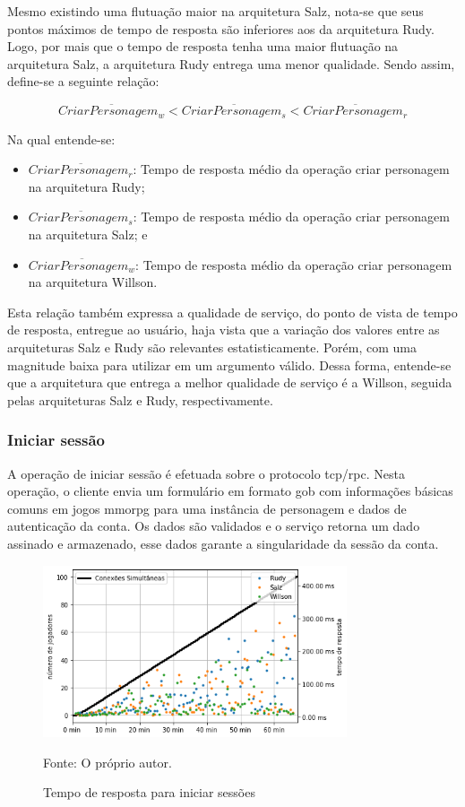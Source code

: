 Mesmo existindo uma flutuação maior na arquitetura Salz, nota-se que seus pontos máximos de tempo de resposta são inferiores aos da arquitetura Rudy.
%
Logo, por mais que o tempo de resposta tenha uma maior flutuação na arquitetura Salz, a arquitetura Rudy entrega uma menor qualidade.
%
Sendo assim, define-se a seguinte relação:

$$
  \overline{CriarPersonagem_{w}} < \overline{CriarPersonagem_{s}} <\overline{CriarPersonagem_{r}}
$$

Na qual entende-se:

\begin{itemize}
 \item $\overline{CriarPersonagem_{r}}$: Tempo de resposta médio da operação criar personagem na arquitetura Rudy;
 \item $\overline{CriarPersonagem_{s}}$: Tempo de resposta médio da operação criar personagem na arquitetura Salz; e
 \item $\overline{CriarPersonagem_{w}}$: Tempo de resposta médio da operação criar personagem na arquitetura Willson.
\end{itemize}

Esta relação também expressa a qualidade de serviço, do ponto de vista de tempo de resposta, entregue ao usuário, haja vista que a variação dos valores entre as arquiteturas Salz e Rudy são relevantes estatisticamente.
%
Porém, com uma magnitude baixa para utilizar em um argumento válido.
%
Dessa forma, entende-se que a arquitetura que entrega a melhor qualidade de serviço é a Willson, seguida pelas arquiteturas Salz e Rudy, respectivamente.



\subsubsection{Iniciar sessão}
\label{sec:op_start_session}
A operação de iniciar sessão é efetuada sobre o protocolo \ac{tcp}/\ac{rpc}.
%
Nesta operação, o cliente envia um formulário em formato \ac{gob} com informações básicas comuns em jogos \ac{mmorpg} para uma instância de personagem e dados de autenticação da conta.
%
Os dados são validados e o serviço retorna um dado assinado e armazenado, esse dados garante a singularidade da sessão da conta.

\begin{figure}[htb!]
  \caption{Tempo de resposta para iniciar sessões}
  \label{fig:start_session_request_time}
  \includegraphics[width=0.8\textwidth]{figuras/analise/rt/start_session_request_time.png}
  \centering

  Fonte: O próprio autor.
\end{figure}


